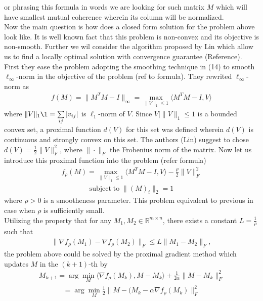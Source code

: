 \documentclass[journal]{IEEEtran}
\begin{document}
or phrasing this formula  in words we are looking for such matrix $M$ which will have smallest mutual coherence wherein its column will be normalized. \\
Now the main question is how does a closed form solution for the problem above look like. It is well known fact that this problem is non-convex and its objective is non-smooth. Further we wil consider the algorithm proposed by Lin which allow us to find a locally optimal solution with convergence guarantee (Reference). \\
First they ease the problem adopting the smoothing technique in (14) to smooth $\ell_{\infty}$-norm in the objective of the problem (ref to formula). They rewrited $\ell_{\infty}$-norm  as
\begin{align}
f(M)=\|M^TM-I\|_{\infty}=\max_{\|V\|_1\leq 1}\langle M^TM-I,V  \rangle
\end{align}
where $\|V\|_1\l=\sum\limits_{ij} | v_{ij}|$ is $\ell_{1}$-norm of $V$. Since ${V| \|V\|_1\leq 1}$ is a bounded convex set, a proximal function $d(V)$ for this set was defined wherein $d(V)$  is continuous and strongly convex on this set. The authors (Lin) suggest to chose $d(V)=\frac{1}{2}\|V \|_F^2$, where $\|\cdot\|_F$ the Frobenius norm of the matrix. Now let us introduce this proximal function into the problem (refer formula) 
\begin{align}
f_{\rho}(M)=\max_{\|V\|_1\leq 1}\langle M^TM-I,V  \rangle-\frac{\rho}{2}\|V \|_F^2
\end{align}
\begin{align}
\textrm{subject}\;\textrm{to} \;\|(M)_i\|_2=1
\end{align}
where $\rho > 0$ is a smootheness parameter. This problem equivalent to previous in case when $\rho$ is sufficiently small.\\ 
Utilizing the property that for any $M_1,M_2\in\mathbb{R}^{m\times n}$, there exists a constant $L=\frac{1}{\rho}$ such that 
\begin{align}
\|  \nabla f_{\rho}(M_1) - \nabla f_{\rho}(M_2) \|_F\leq L\| M_1-M_2\|_F,
\end{align}
the problem above could be solved by the proximal gradient method which updates $M$ in the $(k +1)$-th by
\begin{align}
M_{k+1}=\arg\min\limits_{M} \langle \nabla f_{\rho} (M_k), M-M_k\rangle+\frac{1}{2\alpha}\| M-M_k  \|_F^2
\end{align}
\begin{align}
=\arg\min\limits_{M} \frac{1}{2}\|  M-(M_k-\alpha \nabla f_{\rho} (M_k)\|_F^2
\end{align}
\end{document}
